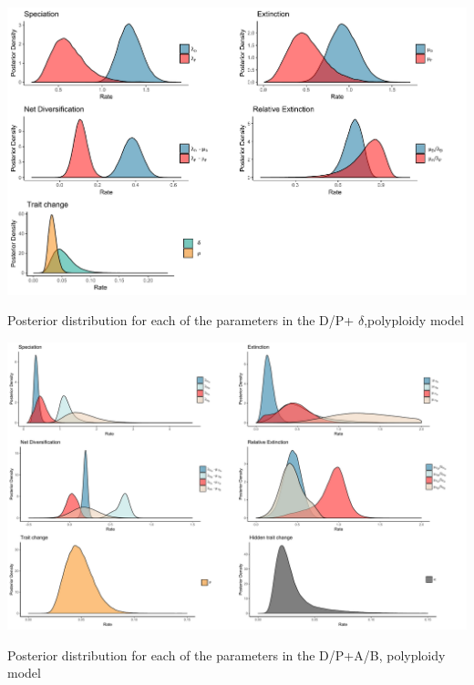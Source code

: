 \begin{suppfigure}
\includegraphics[width=\textwidth]{bisseDPposteriordist.pdf}
\caption{Posterior distribution for each of the parameters in the D/P+ $\delta$,polyploidy model} %
\label{suppfigure:DP}
\end{suppfigure}

\begin{suppfigure}
\includegraphics[width=\textwidth]{hisseDPnodipposteriordist.pdf}
\caption{Posterior distribution for each of the parameters in the D/P+A/B, polyploidy model} %
\label{suppfigure:DPnodipAB}
\end{suppfigure}


